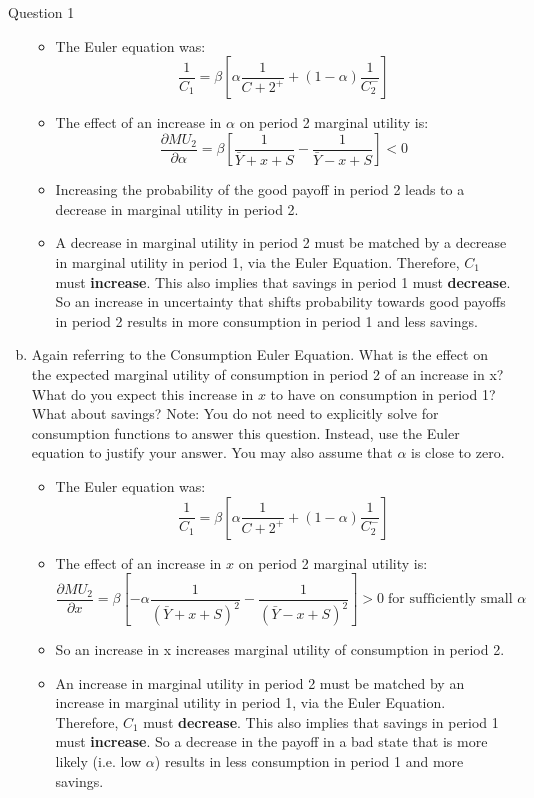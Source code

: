 \documentclass[a4paper]{article}
\begin{document}
\begin{questionbox}{Question 1}
\begin{enumerate}[(a)]
\begin{explanationbox}
				\begin{itemize}
					\item The Euler equation was:
					\[
						\frac{1}{C_1} = \beta \left[ \alpha\frac{1}{C+2^+} + (1-\alpha) \frac{1}{C_2^-} \right]
					\]
					\item The eﬀect of an increase in \( \alpha \) on period 2 marginal utility is:
					\[
						\frac{\partial MU_2}{\partial \alpha} = \beta \left[ \frac{1}{\bar{Y} + x + S} - \frac{1}{\bar{Y} - x + S} \right] < 0
					\]
					\item Increasing the probability of the good payoﬀ in period 2 leads to a decrease in marginal utility in period 2.
					\item A decrease in marginal utility in period 2 must be matched by a decrease in marginal utility in period 1, via the Euler Equation. Therefore, \( C_1 \) must \textbf{increase}. This also implies that savings in period 1 must \textbf{decrease}. So an increase in uncertainty that shifts probability towards good payoﬀs in period 2 results in more consumption in period 1 and less savings.
				\end{itemize}
			\end{explanationbox}
			\item Again referring to the Consumption Euler Equation. What is the eﬀect on the expected marginal utility of consumption in period 2 of an increase in x? What do you expect this increase in \( x \) to have on consumption in period 1? What about savings? Note: You do not need to explicitly solve for consumption functions to answer this question. Instead, use the Euler equation to justify your answer. You may also assume that \( \alpha \) is close to zero.
			\begin{explanationbox}
				\begin{itemize}
					\item The Euler equation was:
					\[
						\frac{1}{C_1} = \beta \left[ \alpha\frac{1}{C+2^+} + (1-\alpha) \frac{1}{C_2^-} \right]
					\]
					\item The eﬀect of an increase in \( x \) on period 2 marginal utility is:
					\[
						\frac{\partial MU_2}{\partial x} = \beta \left[ -\alpha\frac{1}{\left( \bar{Y} + x + S \right)^2} - \frac{1}{\left( \bar{Y} - x + S \right)^2} \right] > 0 \; \text{for sufficiently small } \alpha
					\]
					\item So an increase in x increases marginal utility of consumption in period 2.
					\item An increase in marginal utility in period 2 must be matched by an increase in marginal utility in period 1, via the Euler Equation. Therefore, \( C_1 \) must \textbf{decrease}. This also implies that savings in period 1 must \textbf{increase}. So a decrease in the payoﬀ in a bad state that is more likely (i.e. low \( \alpha \)) results in less consumption in period 1 and more savings.
				\end{itemize}
			\end{explanationbox}
		\end{enumerate}
	\end{questionbox}
\end{document}
